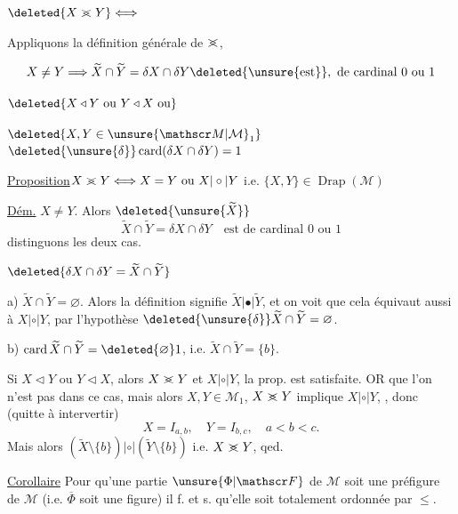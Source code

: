 
$\deleted{X\mathrel{>\mkern-12mu<}Y}\Longleftrightarrow$

 Appliquons la définition générale de $\mathrel{>\mkern-12mu<}$,


\[
X\ne Y\Longrightarrow\widetilde X\cap\widetilde Y=\delta X\cap\delta Y\deleted{\unsure{\text{est}}},\ \text{de cardinal }0\text{ ou }1
\]

$\deleted{X\triangleleft Y\text{ ou }Y\triangleleft X\text{ ou}}$

$\deleted{X,Y\in\unsure{\mathscr M|\mathcal M}_1}$\quad $\deleted{\unsure{\delta}}\operatorname{card}(\delta X\cap\delta Y)=1$


\uline{Proposition}\quad $X\mathrel{>\mkern-12mu<}Y\Longleftrightarrow X=Y\text{ ou }X|\circ|Y$ i.e. $\{X,Y\}\in\operatorname{Drap}(\mathscr M)$

 \uline{Dém.}\quad {} $X\ne Y$. Alors $\deleted{\unsure{\widetilde X}}$
\[
\widetilde X\cap\widetilde Y=\delta X\cap\delta Y\quad\text{est de cardinal }0\text{ ou }1
\]
distinguons les deux cas.

$\deleted{\delta X\cap\delta Y=\widetilde X\cap\widetilde Y}$

a) $\widetilde X\cap\widetilde Y=\varnothing$. Alors la définition  signifie $\widetilde X|\bullet|\widetilde Y$, et on voit que cela équivaut aussi à $X|\circ|Y$, par l'hypothèse $\deleted{\unsure{\delta}}\widetilde X\cap\widetilde Y=\varnothing$.

b) $\operatorname{card}\widetilde X\cap\widetilde Y=\deleted{\varnothing}1$, i.e. $\widetilde X\cap\widetilde Y=\{b\}$.  

 Si $X\triangleleft Y$ ou $Y\triangleleft X$, alors $X\mathrel{>\mkern-12mu<}Y$ et $X|\circ|Y$, la prop. est satisfaite. OR   que l'on n'est pas dans ce cas, mais alors $X,Y\in\mathscr M_1$,   $X\mathrel{>\mkern-12mu<}Y$  implique $X|\circ|Y$, , donc (quitte à intervertir)
\[
X=I_{a,b},\quad Y=I_{b,c},\quad a<b<c.
\]
Mais alors $(\widetilde X\setminus\{b\})|\circ|(\widetilde Y\setminus\{b\})$ i.e. $X\mathrel{>\mkern-12mu<}Y$, qed.

\uline{Corollaire} Pour qu'une partie  $\unsure{\Phi|\mathscr F}$ de $\mathscr M$ soit une préfigure de $\mathscr M$ (i.e. $\overline\Phi$ soit une figure) il f. et s. qu'elle soit totalement ordonnée par $\leq$.
